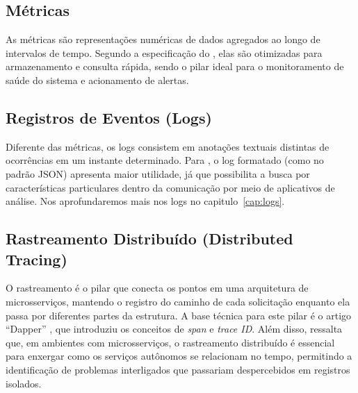 \documentclass[
    12pt
    ,oneside
    ,a4paper
    ,chapter=TITLE
    ,section=TITLE
    ,sumario=abnt-6027-2012]{abntex2}
\begin{document}
\subsection{Métricas}

As métricas são representações numéricas de dados agregados ao longo de intervalos de tempo. Segundo a especificação do , elas são otimizadas para armazenamento e consulta rápida, sendo o pilar ideal para o monitoramento de saúde do sistema e acionamento de alertas.

\subsection{Registros de Eventos (Logs)}

Diferente das métricas, os logs consistem em anotações textuais distintas de ocorrências em um instante determinado. Para , o log formatado (como no padrão JSON) apresenta maior utilidade, já que possibilita a busca por características particulares dentro da comunicação por meio de aplicativos de análise. Nos aprofundaremos mais nos logs no capitulo~\ref{cap:logs}.

\subsection{Rastreamento Distribuído (Distributed Tracing)}

O rastreamento é o pilar que conecta os pontos em uma arquitetura de microsserviços, mantendo o registro do caminho de cada solicitação enquanto ela passa por diferentes partes da estrutura. A base técnica para este pilar é o artigo ``Dapper'' \cite{sigelman2010dapper}, que introduziu os conceitos de \textit{span} e \textit{trace ID}. Além disso,  ressalta que, em ambientes com microsserviços, o rastreamento distribuído é essencial para enxergar como os serviços autônomos se relacionam no tempo, permitindo a identificação de problemas interligados que passariam despercebidos em registros isolados.


\end{document}
